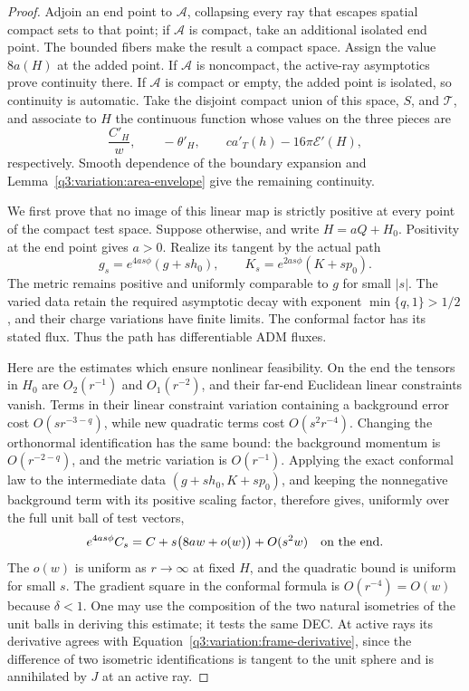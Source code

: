 \begin{proof}
Adjoin an end point to $\mathcal A$, collapsing every ray that escapes
spatial compact sets to that point; if $\mathcal A$ is compact, take
an additional isolated end point.  The bounded fibers make the
result a compact space.  Assign the value $8a(H)$ at the added
point.  If $\mathcal A$ is noncompact, the active-ray asymptotics
prove continuity there.  If $\mathcal A$ is compact or empty, the
added point is isolated, so continuity is automatic.  Take the disjoint compact
union of this space, $S$, and $\mathcal T$, and associate to $H$ the
continuous function whose values on the three pieces are
\begin{equation}
 \frac{C'_H}{w},\qquad -\theta'_H,\qquad
 c a'_T(h)-16\pi\mathcal E'(H),
 \label{q3:variation:test-map}
\end{equation}
respectively.  Smooth dependence of the boundary expansion and
Lemma~\ref{q3:variation:area-envelope} give the remaining continuity.

We first prove that no image of this linear map is strictly positive
at every point of the compact test space.  Suppose otherwise, and
write $H=aQ+H_0$.  Positivity at the end point gives $a>0$.
Realize its tangent by the actual path
\begin{equation}
 g_s=e^{4as\phi}(g+s h_0),\qquad
 K_s=e^{2as\phi}(K+s p_0).
 \label{q3:variation:feasible-path}
\end{equation}
The metric remains positive and uniformly comparable to $g$ for
small $|s|$.  The varied data retain the required asymptotic decay
with exponent $\min\{q,1\}>1/2$, and their charge variations have finite
limits.  The conformal factor has its stated flux.  Thus the path
has differentiable ADM fluxes.

Here are the estimates which ensure nonlinear feasibility.  On the
end the tensors in $H_0$ are $O_2(r^{-1})$ and $O_1(r^{-2})$, and
their far-end Euclidean linear constraints vanish.  Terms in their
linear constraint variation containing a background error cost
$O(s r^{-3-q})$, while new quadratic terms cost $O(s^2r^{-4})$.
Changing the orthonormal identification has the same bound: the
background momentum is $O(r^{-2-q})$, and the metric variation is
$O(r^{-1})$.  Applying the exact conformal law to the intermediate
data $(g+s h_0,K+s p_0)$, and keeping the nonnegative background
term with its positive scaling factor, therefore gives, uniformly
over the full unit ball of test vectors,
\begin{equation}
 e^{4as\phi}C_s
  =C+s\bigl(8a w+o(w)\bigr)+O(s^2w)
  \quad\hbox{on the end}.
 \label{q3:variation:nonlinear-end}
\end{equation}
The $o(w)$ is uniform as $r\to\infty$ at fixed $H$, and the
quadratic bound is uniform for small $s$.  The gradient square in
the conformal formula is $O(r^{-4})=O(w)$ because $\delta<1$.
One may use the composition of the two natural isometries of the
unit balls in deriving this estimate; it tests the same DEC.
At active rays its derivative agrees with
Equation~\eqref{q3:variation:frame-derivative}, since the difference of
two isometric identifications is tangent to the unit sphere and is
annihilated by $J$ at an active ray.


\end{proof}
